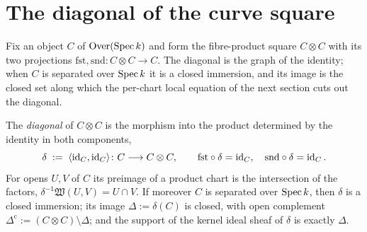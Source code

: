 \section{The diagonal of the curve square}

Fix an object \(C\) of \(\mathrm{Over}(\operatorname{Spec} k)\) and form the fibre-product square \(C \otimes C\) with
its two projections \(\mathrm{fst}, \mathrm{snd} \colon C \otimes C \to C\). The diagonal is the
graph of the identity; when \(C\) is separated over \(\operatorname{Spec} k\) it is a closed immersion, and its
image is the closed set along which the per-chart local equation of the next section cuts out the
diagonal.

\begin{definition}
  \label{pa-def:diagonal}
  \leanok

  The \emph{diagonal} of \(C \otimes C\) is the morphism into the product determined by the
  identity in both components,
  \[
    \delta \;:=\; \langle \operatorname{id}_C, \operatorname{id}_C \rangle \colon C \longrightarrow C \otimes C, \qquad
    \mathrm{fst} \circ \delta = \operatorname{id}_C, \quad \mathrm{snd} \circ \delta = \operatorname{id}_C .
  \]
  For opens \(U, V\) of \(C\) its preimage of a product chart is the intersection of the factors,
  \(\delta^{-1}\mathfrak W(U,V) = U \cap V\). If moreover \(C\) is separated over \(\operatorname{Spec} k\),
  then \(\delta\) is a closed immersion; its image \(\Delta := \delta(C)\) is closed, with open
  complement \(\Delta^{\mathrm{c}} := (C \otimes C) \setminus \Delta\); and the support of the
  kernel ideal sheaf of \(\delta\) is exactly \(\Delta\).
\end{definition}
